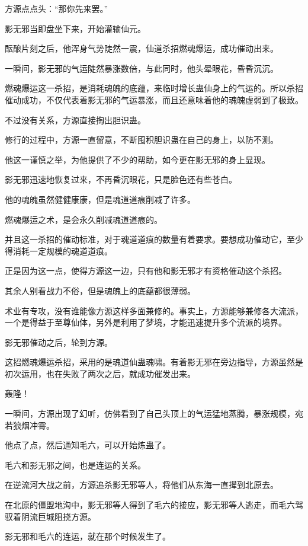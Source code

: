 \begin{this_body}
方源点点头：“那你先来罢。”

影无邪当即盘坐下来，开始灌输仙元。

酝酿片刻之后，他浑身气势陡然一震，仙道杀招燃魂爆运，成功催动出来。

一瞬间，影无邪的气运陡然暴涨数倍，与此同时，他头晕眼花，昏昏沉沉。

燃魂爆运这一杀招，是消耗魂魄的底蕴，来临时增长蛊仙身上的气运的。所以杀招催动成功，不仅代表着影无邪的气运暴涨，而且还意味着他的魂魄虚弱到了极致。

不过没有关系，方源直接掏出胆识蛊。

修行的过程中，方源一直留意，不断囤积胆识蛊在自己的身上，以防不测。

他这一谨慎之举，为他提供了不少的帮助，如今更在影无邪的身上显现。

影无邪迅速地恢复过来，不再昏沉眼花，只是脸色还有些苍白。

他的魂魄虽然健健康康，但是魂道道痕削减了许多。

燃魂爆运之术，是会永久削减魂道道痕的。

并且这一杀招的催动标准，对于魂道道痕的数量有着要求。要想成功催动它，至少得消耗一定规模的魂道道痕。

正是因为这一点，使得方源这一边，只有他和影无邪才有资格催动这个杀招。

其余人别看战力不俗，但是魂魄上的底蕴都很薄弱。

术业有专攻，没有谁能像方源这样多面兼修的。事实上，方源能够兼修各大流派，一个是得益于至尊仙体，另外是利用了梦境，才能迅速提升多个流派的境界。

影无邪催动之后，轮到方源。

这招燃魂爆运杀招，采用的是魂道仙蛊魂啸。有着影无邪在旁边指导，方源虽然是初次运用，也在失败了两次之后，就成功催发出来。

轰隆！

一瞬间，方源出现了幻听，仿佛看到了自己头顶上的气运猛地蒸腾，暴涨规模，宛若狼烟冲霄。

他点了点，然后通知毛六，可以开始炼蛊了。

毛六和影无邪之间，也是连运的关系。

在逆流河大战之前，方源追杀影无邪等人，将他们从东海一直撵到北原去。

在北原的僵盟地沟中，影无邪等人得到了毛六的接应，影无邪等人逃走，而毛六驾驭着阴流巨城阻挠方源。

影无邪和毛六的连运，就在那个时候发生了。


\end{this_body}
